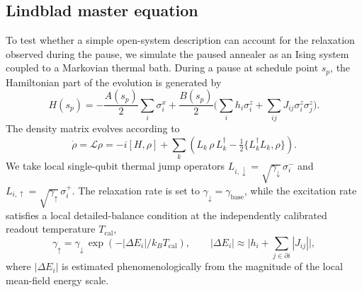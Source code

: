 \documentclass[aps,prapplied,reprint,superscriptaddress,floatfix,nofootinbib]{revtex4-2}
\begin{document}
\subsection{Lindblad master equation}
\label{sec:lindblad}

To test whether a simple open-system description can account for the relaxation observed during the pause, we simulate the paused annealer as an Ising system coupled to a Markovian thermal bath.
During a pause at schedule point $s_p$, the Hamiltonian part of the evolution is generated by
\begin{equation}
H(s_p)= -\frac{A(s_p)}{2}\sum_i \sigma_i^x + \frac{B(s_p)}{2}\bigg(\sum_i h_i \sigma_i^z + \sum_{ij} J_{ij}\sigma_i^z \sigma_j^z\bigg).
\end{equation}
The density matrix evolves according to
\begin{equation}
\dot{\rho}=\mathcal{L}\rho = -i[H,\rho] + \sum_k \left(L_k\,\rho\,L_k^{\dagger}-\tfrac{1}{2}\{L_k^{\dagger} L_k,\rho\}\right).
\end{equation}
We take local single-qubit thermal jump operators $L_{i,\downarrow}=\sqrt{\gamma_\downarrow}\,\sigma_i^{-}$ and $L_{i,\uparrow}=\sqrt{\gamma_\uparrow}\,\sigma_i^{+}$.
The relaxation rate is set to $\gamma_\downarrow=\gamma_\text{base}$, while the excitation rate satisfies a local detailed-balance condition at the independently calibrated readout temperature $T_\mathrm{cal}$,
\begin{equation}
\gamma_\uparrow = \gamma_\downarrow\,\exp(-|\Delta E_i|/k_B T_\mathrm{cal}), \qquad |\Delta E_i| \approx \Big|h_i + \sum_{j \in \partial i}|J_{ij}|\Big|,
\end{equation}
where $|\Delta E_i|$ is estimated phenomenologically from the magnitude of the local mean-field energy scale.
\end{document}
